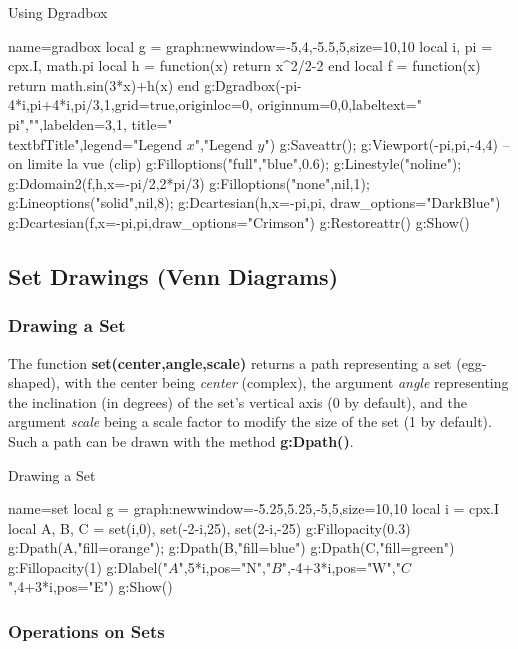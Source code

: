 \begin{demo}{Using Dgradbox}
\begin{luadraw}{name=gradbox}
local g = graph:new{window={-5,4,-5.5,5},size={10,10}}
local i, pi = cpx.I, math.pi
local h = function(x) return x^2/2-2 end
local f = function(x) return math.sin(3*x)+h(x) end
g:Dgradbox({-pi-4*i,pi+4*i,pi/3,1},{grid=true,originloc=0, originnum={0,0},labeltext={"\\pi",""},labelden={3,1}, title="\\textbf{Title}",legend={"Legend $x$","Legend $y$"}})
g:Saveattr(); g:Viewport(-pi,pi,-4,4) -- on limite la vue (clip)
g:Filloptions("full","blue",0.6); g:Linestyle("noline"); g:Ddomain2(f,h,{x={-pi/2,2*pi/3}})
g:Filloptions("none",nil,1); g:Lineoptions("solid",nil,8); g:Dcartesian(h,{x={-pi,pi}, draw_options="DarkBlue"})
g:Dcartesian(f,{x={-pi,pi},draw_options="Crimson"})
g:Restoreattr()
g:Show()
\end{luadraw}
\end{demo}

\subsection{Set Drawings (Venn Diagrams)}

\subsubsection{Drawing a Set}

The function \textbf{set(center,angle,scale)} returns a path representing a set (egg-shaped), with the center being \emph{center} (complex), the argument \emph{angle} representing the inclination (in degrees) of the set's vertical axis (0 by default), and the argument \emph{scale} being a scale factor to modify the size of the set (1 by default). Such a path can be drawn with the method \textbf{g:Dpath()}.

\begin{demo}{Drawing a Set}
\begin{luadraw}{name=set}
local g = graph:new{window={-5.25,5.25,-5,5},size={10,10}}
local i = cpx.I
local A, B, C = set(i,0), set(-2-i,25), set(2-i,-25)
g:Fillopacity(0.3)
g:Dpath(A,"fill=orange"); g:Dpath(B,"fill=blue")
g:Dpath(C,"fill=green")
g:Fillopacity(1)
g:Dlabel("$A$",5*i,{pos="N"},"$B$",-4+3*i,{pos="W"},"$C$",4+3*i,{pos="E"})
g:Show()
\end{luadraw}
\end{demo}

\subsubsection{Operations on Sets}

